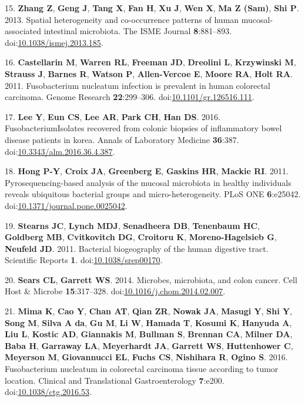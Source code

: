 \documentclass[11pt,]{article}
\begin{document}
\hypertarget{ref-Zhang2013}{}
15. \textbf{Zhang Z}, \textbf{Geng J}, \textbf{Tang X}, \textbf{Fan H},
\textbf{Xu J}, \textbf{Wen X}, \textbf{Ma Z (Sam)}, \textbf{Shi P}.
2013. Spatial heterogeneity and co-occurrence patterns of human
mucosal-associated intestinal microbiota. The ISME Journal
\textbf{8}:881--893.
doi:\href{https://doi.org/10.1038/ismej.2013.185}{10.1038/ismej.2013.185}.

\hypertarget{ref-Castellarin2011}{}
16. \textbf{Castellarin M}, \textbf{Warren RL}, \textbf{Freeman JD},
\textbf{Dreolini L}, \textbf{Krzywinski M}, \textbf{Strauss J},
\textbf{Barnes R}, \textbf{Watson P}, \textbf{Allen-Vercoe E},
\textbf{Moore RA}, \textbf{Holt RA}. 2011. Fusobacterium nucleatum
infection is prevalent in human colorectal carcinoma. Genome Research
\textbf{22}:299--306.
doi:\href{https://doi.org/10.1101/gr.126516.111}{10.1101/gr.126516.111}.

\hypertarget{ref-Lee2016}{}
17. \textbf{Lee Y}, \textbf{Eun CS}, \textbf{Lee AR}, \textbf{Park CH},
\textbf{Han DS}. 2016. FusobacteriumIsolates recovered from colonic
biopsies of inflammatory bowel disease patients in korea. Annals of
Laboratory Medicine \textbf{36}:387.
doi:\href{https://doi.org/10.3343/alm.2016.36.4.387}{10.3343/alm.2016.36.4.387}.

\hypertarget{ref-Hong2011}{}
18. \textbf{Hong P-Y}, \textbf{Croix JA}, \textbf{Greenberg E},
\textbf{Gaskins HR}, \textbf{Mackie RI}. 2011. Pyrosequencing-based
analysis of the mucosal microbiota in healthy individuals reveals
ubiquitous bacterial groups and micro-heterogeneity. PLoS ONE
\textbf{6}:e25042.
doi:\href{https://doi.org/10.1371/journal.pone.0025042}{10.1371/journal.pone.0025042}.

\hypertarget{ref-Stearns2011}{}
19. \textbf{Stearns JC}, \textbf{Lynch MDJ}, \textbf{Senadheera DB},
\textbf{Tenenbaum HC}, \textbf{Goldberg MB}, \textbf{Cvitkovitch DG},
\textbf{Croitoru K}, \textbf{Moreno-Hagelsieb G}, \textbf{Neufeld JD}.
2011. Bacterial biogeography of the human digestive tract. Scientific
Reports \textbf{1}.
doi:\href{https://doi.org/10.1038/srep00170}{10.1038/srep00170}.

\hypertarget{ref-Sears2014}{}
20. \textbf{Sears CL}, \textbf{Garrett WS}. 2014. Microbes, microbiota,
and colon cancer. Cell Host \& Microbe \textbf{15}:317--328.
doi:\href{https://doi.org/10.1016/j.chom.2014.02.007}{10.1016/j.chom.2014.02.007}.

\hypertarget{ref-Mima2016}{}
21. \textbf{Mima K}, \textbf{Cao Y}, \textbf{Chan AT}, \textbf{Qian ZR},
\textbf{Nowak JA}, \textbf{Masugi Y}, \textbf{Shi Y}, \textbf{Song M},
\textbf{Silva A da}, \textbf{Gu M}, \textbf{Li W}, \textbf{Hamada T},
\textbf{Kosumi K}, \textbf{Hanyuda A}, \textbf{Liu L}, \textbf{Kostic
AD}, \textbf{Giannakis M}, \textbf{Bullman S}, \textbf{Brennan CA},
\textbf{Milner DA}, \textbf{Baba H}, \textbf{Garraway LA},
\textbf{Meyerhardt JA}, \textbf{Garrett WS}, \textbf{Huttenhower C},
\textbf{Meyerson M}, \textbf{Giovannucci EL}, \textbf{Fuchs CS},
\textbf{Nishihara R}, \textbf{Ogino S}. 2016. Fusobacterium nucleatum in
colorectal carcinoma tissue according to tumor location. Clinical and
Translational Gastroenterology \textbf{7}:e200.
doi:\href{https://doi.org/10.1038/ctg.2016.53}{10.1038/ctg.2016.53}.
\end{document}
